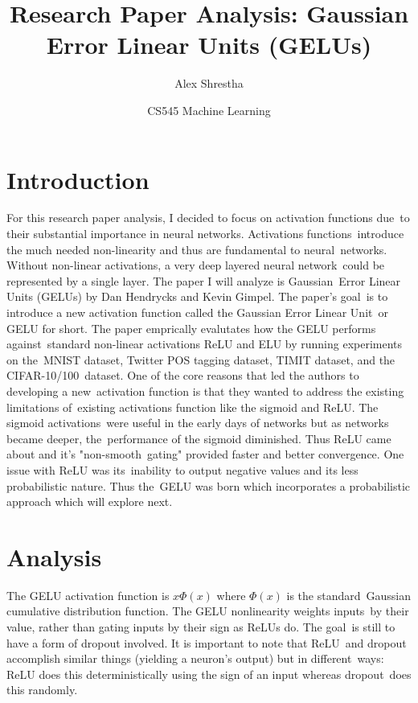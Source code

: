 \documentclass[12pt]{article}
\title{Research Paper Analysis: Gaussian Error Linear Units (GELUs)}
\author{Alex Shrestha}
\date{CS545 Machine Learning }
\begin{document}
\maketitle

\section{Introduction}
For this research paper analysis, I decided to focus on activation functions due\
to their substantial importance in neural networks. Activations functions\ 
introduce the much needed non-linearity and thus are fundamental to neural\
networks. Without non-linear activations, a very deep layered neural network\
could be represented by a single layer. The paper I will analyze is Gaussian\
Error Linear Units (GELUs)\cite{DBLP:journals/corr/HendrycksG16} by Dan Hendrycks and Kevin Gimpel. 
The paper's goal\
is to introduce a new activation function called the Gaussian Error Linear Unit\
or GELU for short. The paper emprically evalutates how the GELU performs against\
standard non-linear activations ReLU and ELU by running experiments on the\
MNIST dataset, Twitter POS tagging dataset, TIMIT dataset, and the CIFAR-10/100\
dataset. One of the core reasons that led the authors to developing a new\
activation function is that they wanted to address the existing limitations of\
existing activations function like the sigmoid and ReLU. The sigmoid activations\
were useful in the early days of networks but as networks became deeper, the\
performance of the sigmoid diminished. Thus ReLU came about and it's "non-smooth\
gating" provided faster and better convergence. One issue with ReLU was its\
inability to output negative values and its less probabilistic nature. Thus the\
GELU was born which incorporates a probabilistic approach which will explore next.

\section{Analysis}
The GELU activation function is \( x \Phi(x) \) where $\Phi(x)$ is the standard\
Gaussian cumulative distribution function. The GELU nonlinearity weights inputs\
by their value, rather than gating inputs by their sign as ReLUs do. The goal\
is still to have a form of dropout involved. It is important to note that ReLU\
and dropout accomplish similar things (yielding a neuron's output) but in different\
ways: ReLU does this deterministically using the sign of an input whereas dropout\
does this randomly.
\end{document}
